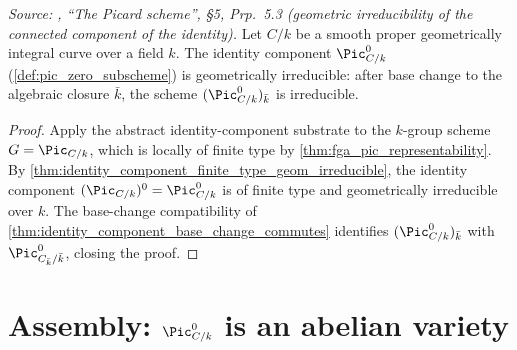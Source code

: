 \begin{theorem}\leanok
  \label{thm:pic0_geom_irred}

  \textit{Source: \cite{kleiman-picard}, ``The Picard scheme'', \S 5, Prp.~5.3
  (geometric irreducibility of the connected component of the
  identity).}
  Let \(C/k\) be a smooth proper geometrically integral curve over a
  field \(k\). The identity component \(\Pic^0_{C/k}\)
  (\cref{def:pic_zero_subscheme}) is geometrically irreducible: after
  base change to the algebraic closure \(\bar k\), the scheme
  \((\Pic^0_{C/k})_{\bar k}\) is irreducible.
\end{theorem}

\begin{proof}\leanok
  Apply the abstract identity-component substrate to the \(k\)-group
  scheme \(G = \Pic_{C/k}\), which is locally of finite type by
  \cref{thm:fga_pic_representability}. By
  \cref{thm:identity_component_finite_type_geom_irreducible}, the
  identity component \((\Pic_{C/k})^0 = \Pic^0_{C/k}\) is of finite
  type and geometrically irreducible over \(k\). The base-change
  compatibility of
  \cref{thm:identity_component_base_change_commutes} identifies
  \((\Pic^0_{C/k})_{\bar k}\) with \(\Pic^0_{C_{\bar k}/\bar k}\),
  closing the proof.
\end{proof}

\section{Assembly: \(\Pic^0_{C/k}\) is an abelian variety}
\label{sec:pic0_isAbelianVariety}

